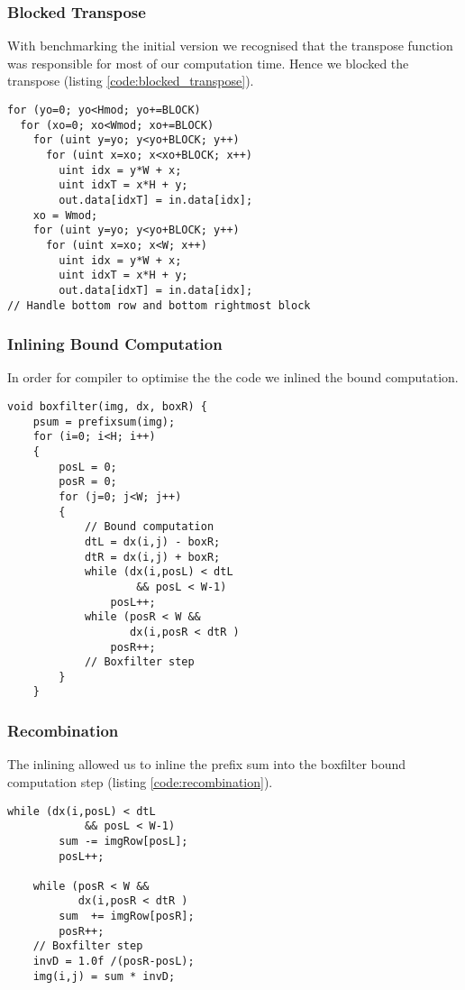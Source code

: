\subsubsection{Blocked Transpose}
With benchmarking the initial version we recognised that the transpose function was responsible for most of our computation time. Hence we blocked the transpose (listing \ref{code:blocked_transpose}).
\begin{lstlisting}[caption=Transpose block, label=code:blocked_transpose]
for (yo=0; yo<Hmod; yo+=BLOCK)
  for (xo=0; xo<Wmod; xo+=BLOCK)
    for (uint y=yo; y<yo+BLOCK; y++)
      for (uint x=xo; x<xo+BLOCK; x++)
        uint idx = y*W + x;
        uint idxT = x*H + y;
        out.data[idxT] = in.data[idx];
    xo = Wmod;
    for (uint y=yo; y<yo+BLOCK; y++)
      for (uint x=xo; x<W; x++)
        uint idx = y*W + x;
        uint idxT = x*H + y;
        out.data[idxT] = in.data[idx];
// Handle bottom row and bottom rightmost block
\end{lstlisting}
\subsubsection{Inlining Bound Computation}
In order for compiler to optimise the the code we inlined the bound computation.
\begin{lstlisting}[caption=Inlining of the bound computation, label=code:inlining]
void boxfilter(img, dx, boxR) {
    psum = prefixsum(img);
    for (i=0; i<H; i++)
    {
        posL = 0;
        posR = 0;
        for (j=0; j<W; j++)
        {
            // Bound computation
            dtL = dx(i,j) - boxR;
            dtR = dx(i,j) + boxR;
            while (dx(i,posL) < dtL 
                    && posL < W-1)
                posL++;
            while (posR < W && 
                   dx(i,posR < dtR )
                posR++;
            // Boxfilter step
        }
    }
\end{lstlisting}
\subsubsection{Recombination}
The inlining allowed us to inline the prefix sum into the boxfilter bound computation step (listing \ref{code:recombination}).
\begin{lstlisting}[caption=Recombination, label=code:recombination]
    while (dx(i,posL) < dtL 
            && posL < W-1)
        sum -= imgRow[posL];
        posL++;

    while (posR < W && 
           dx(i,posR < dtR )
        sum  += imgRow[posR];
        posR++;
    // Boxfilter step
    invD = 1.0f /(posR-posL);
    img(i,j) = sum * invD;
\end{lstlisting}
